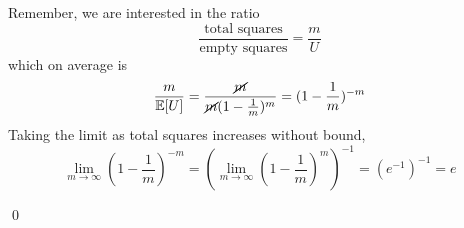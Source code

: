 \documentclass[a4paper,12pt]{article}
\begin{document}
\noindent Remember, we are interested in the ratio
\begin{equation*}
	\frac{\text{total squares}}{\text{empty squares}} = \frac{m}{U}
\end{equation*}
\indent which on average is
\begin{equation*}
	\frac{m}{\mathbb{E}[U]} = \frac{\cancel{m}}{\cancel{m}(1-\frac{1}{m})^m} = (1-\frac{1}{m})^{-m}
\end{equation*}
\indent Taking the limit as total squares increases without bound,
\begin{equation}
	\lim_{m\to\infty} (1-\frac{1}{m})^{-m} = (\lim_{m\to\infty} (1-\frac{1}{m})^m)^{-1} = (e^{-1})^{-1} = e
\end{equation}

\qed
\end{document}
